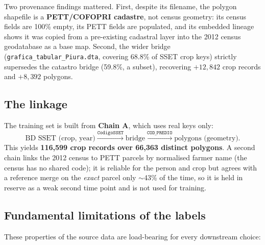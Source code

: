 \documentclass[11pt,a4paper]{article}
\begin{document}
Two provenance findings mattered. First, despite its filename, the polygon shapefile is a
\textbf{PETT/COFOPRI cadastre}, not census geometry: its census fields are 100\% empty, its PETT
fields are populated, and its embedded lineage shows it was copied from a pre-existing cadastral
layer into the 2012 census geodatabase as a base map. Second, the wider bridge
(\texttt{grafica\_tabular\_Piura.dta}, covering 68.8\% of SSET crop keys) strictly supersedes
the catastro bridge (59.8\%, a subset), recovering $+12{,}842$ crop records and $+8{,}392$
polygons.

\subsection{The linkage}

The training set is built from \textbf{Chain A}, which uses real keys only:
\[
\text{BD SSET (crop, year)} \xrightarrow{\texttt{CodigoSSET}}
\text{bridge} \xrightarrow{\texttt{COD\_PREDIO}}
\text{polygons (geometry)}.
\]
This yields \textbf{116{,}599 crop records over 66{,}363 distinct polygons}. A second chain
links the 2012 census to PETT parcels by normalised farmer name (the census has no shared code);
it is reliable for the person and crop but agrees with a reference merge on the \emph{exact}
parcel only $\sim$43\% of the time, so it is held in reserve as a weak second time point and is
not used for training.

\subsection{Fundamental limitations of the labels}
\label{sec:limits}

These properties of the source data are load-bearing for every downstream choice:
\end{document}

